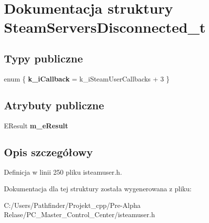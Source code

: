 \hypertarget{struct_steam_servers_disconnected__t}{}\section{Dokumentacja struktury Steam\+Servers\+Disconnected\+\_\+t}
\label{struct_steam_servers_disconnected__t}
\subsection*{Typy publiczne}
\begin{DoxyCompactItemize}
\item 
\mbox{\label{struct_steam_servers_disconnected__t_ae973aac53d4ab47c50e5292965718f43}} 
enum \{ {\bfseries k\+\_\+i\+Callback} = k\+\_\+i\+Steam\+User\+Callbacks + 3
 \}
\end{DoxyCompactItemize}
\subsection*{Atrybuty publiczne}
\begin{DoxyCompactItemize}
\item 
\mbox{\label{struct_steam_servers_disconnected__t_a920d125eed83d1fa0d29594cf61f3837}} 
E\+Result {\bfseries m\+\_\+e\+Result}
\end{DoxyCompactItemize}


\subsection{Opis szczegółowy}


Definicja w linii 250 pliku isteamuser.\+h.



Dokumentacja dla tej struktury została wygenerowana z pliku\+:\begin{DoxyCompactItemize}
\item 
C\+:/\+Users/\+Pathfinder/\+Projekt\+\_\+cpp/\+Pre-\/\+Alpha Relase/\+P\+C\+\_\+\+Master\+\_\+\+Control\+\_\+\+Center/isteamuser.\+h\end{DoxyCompactItemize}
